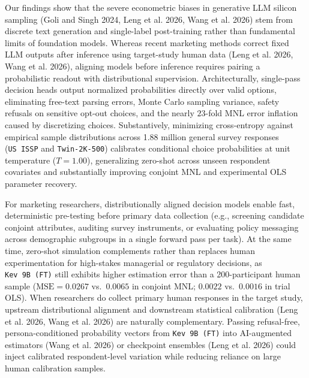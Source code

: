 \documentclass[
  11pt,
  letterpaper,
]{article}
\begin{document}
Our findings show that the severe econometric biases in generative LLM
silicon sampling (Goli and Singh 2024, Leng et al. 2026, Wang et al.
2026) stem from discrete text generation and single-label post-training
rather than fundamental limits of foundation models. Whereas recent
marketing methods correct fixed LLM outputs after inference using
target-study human data (Leng et al. 2026, Wang et al. 2026), aligning
models before inference requires pairing a probabilistic readout with
distributional supervision. Architecturally, single-pass decision heads
output normalized probabilities directly over valid options, eliminating
free-text parsing errors, Monte Carlo sampling variance, safety refusals
on sensitive opt-out choices, and the nearly \(23\)-fold MNL error
inflation caused by discretizing choices. Substantively, minimizing
cross-entropy against empirical sample distributions across 1.88 million
general survey responses (\texttt{US\ ISSP} and \texttt{Twin-2K-500})
calibrates conditional choice probabilities at unit temperature
(\(T = 1.00\)), generalizing zero-shot across unseen respondent
covariates and substantially improving conjoint MNL and experimental OLS
parameter recovery.

For marketing researchers, distributionally aligned decision models
enable fast, deterministic pre-testing before primary data collection
(e.g., screening candidate conjoint attributes, auditing survey
instruments, or evaluating policy messaging across demographic subgroups
in a single forward pass per task). At the same time, zero-shot
simulation complements rather than replaces human experimentation for
high-stakes managerial or regulatory decisions, as
\texttt{Kev\ 9B\ (FT)} still exhibits higher estimation error than a
200-participant human sample (\(\mathrm{MSE} = 0.0267\) vs.~\(0.0065\)
in conjoint MNL; \(0.0022\) vs.~\(0.0016\) in trial OLS). When
researchers do collect primary human responses in the target study,
upstream distributional alignment and downstream statistical calibration
(Leng et al. 2026, Wang et al. 2026) are naturally complementary.
Passing refusal-free, persona-conditioned probability vectors from
\texttt{Kev\ 9B\ (FT)} into AI-augmented estimators (Wang et al. 2026)
or checkpoint ensembles (Leng et al. 2026) could inject calibrated
respondent-level variation while reducing reliance on large human
calibration samples.
\end{document}
